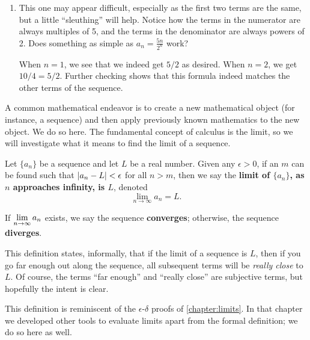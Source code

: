\begin{example}
\begin{enumerate}
\item		This one may appear difficult, especially as the first two terms are the same, but a little ``sleuthing'' will help. Notice how the terms in the numerator are always multiples of 5, and the terms in the denominator are always powers of 2. Does something as simple as $a_n = \frac{5n}{2^n}$ work?

When $n=1$, we see that we indeed get $5/2$ as desired. When $n=2$, we get $10/4 = 5/2$. Further checking shows that this formula indeed matches the other terms of the sequence.
\end{enumerate}
\end{example}

A common mathematical endeavor is to create a new mathematical object (for instance, a sequence) and then apply previously known mathematics to the new object. We do so here. The fundamental concept of calculus is the limit, so we will investigate what it means to find the limit of a sequence.

\begin{definition}\label{def:seq_limit}%
Let $\{a_n\}$ be a sequence and let $L$ be a real number. Given any $\epsilon>0$, if an $m$ can be found such that $\left\lvert a_n-L \right\rvert<\epsilon$ for all $n>m$, then we say the \textbf{limit of $\{a_n\}$, as $n$ approaches infinity, is $L$}, denoted \[\lim_{n\to\infty}a_n = L.\]

If $\displaystyle\lim_{n\to\infty} a_n$ exists, we say the sequence \textbf{converges}; otherwise, the sequence \textbf{diverges}.
\end{definition}

This definition states, informally, that if the limit of a sequence is $L$, then if you go far enough out along the sequence, all subsequent terms will be \emph{really close} to $L$. Of course, the terms ``far enough'' and ``really close'' are subjective terms, but hopefully the intent is clear.

This definition is reminiscent of the $\epsilon$-$\delta$ proofs of \autoref{chapter:limits}. In that chapter we developed other tools to evaluate limits apart from the formal definition; we do so here as well.

